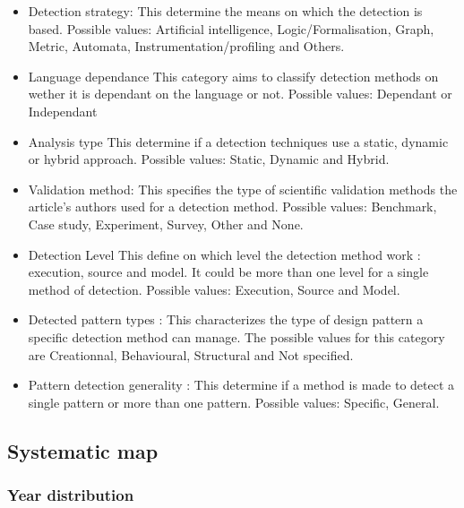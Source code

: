 \documentclass[letterpaper, 10 pt, conference]{ieeeconf}  %
\begin{document}
\begin{itemize}
  \item Detection strategy:
    This determine the means on which the detection is based.
    Possible values: Artificial intelligence, Logic/Formalisation, Graph,
    Metric, Automata, Instrumentation/profiling and Others.

  \item Language dependance
    This category aims to classify detection methods on wether it is dependant
    on the language or not. 
    Possible values: Dependant or Independant

  \item Analysis type
    This determine if a detection techniques use a static, dynamic or hybrid
    approach.
    Possible values: Static, Dynamic and Hybrid.

  \item Validation method:
    This specifies the type of scientific validation methods the article's 
    authors used for a detection method.
    Possible values: Benchmark, Case study, Experiment, Survey, Other and
    None.
    
  \item{Detection Level}
    This define on which level the detection method work : execution, source
    and model.
    It could be more than one level for a single method of detection.
    Possible values: Execution, Source and Model.

  \item Detected pattern types :
    This characterizes the type of design pattern a specific detection method
    can manage.
    The possible values for this category are Creationnal, Behavioural,
    Structural and Not specified.

  \item Pattern detection generality :
    This determine if a method is made to detect a single pattern or more than
    one pattern.
    Possible values: Specific, General.
\end{itemize}

\subsection{Systematic map}



\subsubsection{Year distribution}
\end{document}
